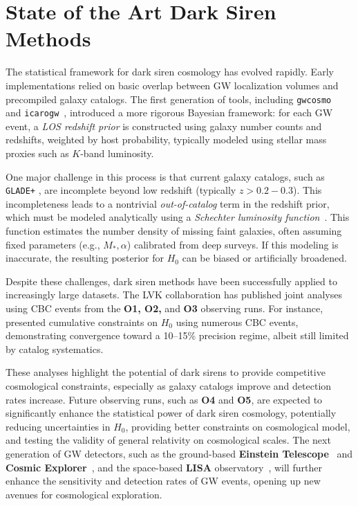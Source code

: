 \section{State of the Art Dark Siren Methods}
The statistical framework for dark siren cosmology has evolved rapidly. Early implementations relied on basic overlap between GW localization volumes and precompiled galaxy catalogs. The first generation of tools, including \texttt{gwcosmo}~\citep{gray2020cosmological, gray2022pixelated, gray2023joint} and \texttt{icarogw}~\citep{mastrogiovanni2021importance, mastrogiovanni2024icarogw}, introduced a more rigorous Bayesian framework: for each \ac{GW} event, a \textit{\ac{LOS} redshift prior} is constructed using galaxy number counts and redshifts, weighted by host probability, typically modeled using stellar mass proxies such as $K$-band luminosity.

One major challenge in this process is that current galaxy catalogs, such as \texttt{GLADE+} \citep{dalya2022glade+}, are incomplete beyond low redshift (typically $ z > 0.2 - 0.3$). This incompleteness leads to a nontrivial \textit{out-of-catalog} term in the redshift prior, which must be modeled analytically using a \textit{Schechter luminosity function}~\citep{schechter1976analytic, gray2023joint, chen2024testing}. This function estimates the number density of missing faint galaxies, often assuming fixed parameters (e.g., $M_*,\alpha$) calibrated from deep surveys. If this modeling is inaccurate, the resulting posterior for $H_0$ can be biased or artificially broadened.

Despite these challenges, dark siren methods have been successfully applied to increasingly large datasets. The \ac{LVK} collaboration has published joint analyses using \ac{CBC} events from the \textbf{O1, O2,} and \textbf{O3} observing runs. For instance,~\citet{abbott2021gravitational, abbott2023constraints} presented cumulative constraints on $H_0$ using numerous \ac{CBC} events, demonstrating convergence toward a 10--15\% precision regime, albeit still limited by catalog systematics.

These analyses highlight the potential of dark sirens to provide competitive cosmological constraints, especially as galaxy catalogs improve and detection rates increase. Future observing runs, such as \textbf{O4} and \textbf{O5}, are expected to significantly enhance the statistical power of dark siren cosmology, potentially reducing uncertainties in $H_0$, providing better constraints on cosmological model, and testing the validity of general relativity on cosmological scales. The next generation of \ac{GW} detectors, such as the ground-based \textbf{Einstein Telescope}~\citep{Abac:ET} and \textbf{Cosmic Explorer}~\citep{Evans:CE}, and the space-based \textbf{LISA} observatory~\citep{LISA:2024hlh}, will further enhance the sensitivity and detection rates of \ac{GW} events, opening up new avenues for cosmological exploration.

